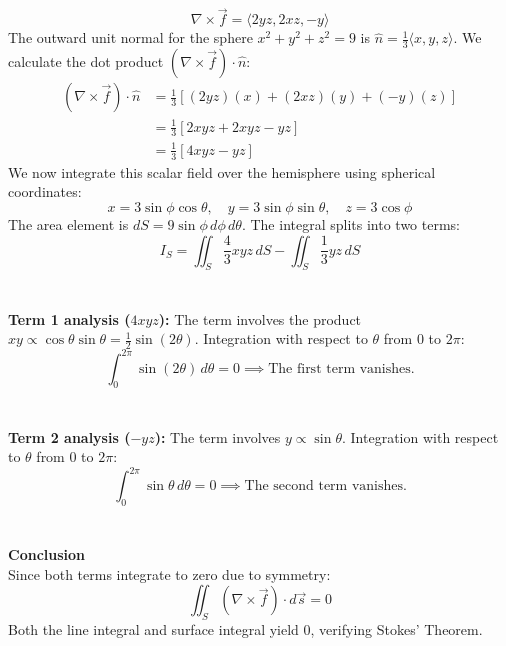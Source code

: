 \documentclass{article}
\begin{document}
\[
	\nabla \times \vec{f} = \langle 2yz, 2xz, -y \rangle
\]
The outward unit normal for the sphere $x^2+y^2+z^2=9$ is $\hat{n} = \frac{1}{3}\langle x, y, z \rangle$.
We calculate the dot product $(\nabla \times \vec{f}) \cdot \hat{n}$:
\begin{align*}
	(\nabla \times \vec{f}) \cdot \hat{n} & = \frac{1}{3} \left[ (2yz)(x) + (2xz)(y) + (-y)(z) \right] \\
	                                      & = \frac{1}{3} [ 2xyz + 2xyz - yz ]                         \\
	                                      & = \frac{1}{3} [ 4xyz - yz ]
\end{align*}
We now integrate this scalar field over the hemisphere using spherical coordinates:
\[
	x = 3\sin\phi\cos\theta, \quad y = 3\sin\phi\sin\theta, \quad z = 3\cos\phi
\]
The area element is $dS = 9 \sin\phi \, d\phi \, d\theta$.
The integral splits into two terms:
\[
	I_S = \iint_S \frac{4}{3}xyz \, dS - \iint_S \frac{1}{3}yz \, dS
\]
\\
\\
\textbf{Term 1 analysis ($4xyz$):}
The term involves the product
$xy \propto \cos\theta \sin\theta = \frac{1}{2}\sin(2\theta)$. Integration with
respect to $\theta$ from $0$ to $2\pi$:
\[
	\int_0^{2\pi} \sin(2\theta) \, d\theta = 0 \implies \text{The first term vanishes.}
\]
\\
\\
\textbf{Term 2 analysis ($-yz$):}
The term involves $y \propto \sin\theta$.
Integration with respect to $\theta$ from $0$ to $2\pi$:
\[
	\int_0^{2\pi} \sin\theta \, d\theta = 0 \implies \text{The second term vanishes.}
\]
\\
\\
\textbf{Conclusion}
\\
Since both terms integrate to zero due to symmetry:
\[
	\iint_S (\nabla \times \vec{f}) \cdot d\vec{s} = 0
\]
Both the line integral and surface integral yield 0, verifying Stokes' Theorem.

\pagebreak

\end{document}
